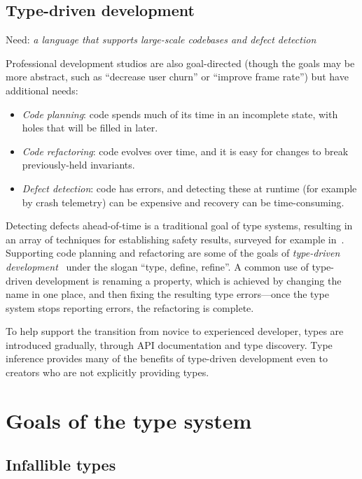 \documentclass[acmsmall]{acmart}
\begin{document}
\subsection{Type-driven development}

Need: \emph{a language that supports large-scale codebases and defect detection}

Professional development studios are also goal-directed (though the
goals may be more abstract, such as ``decrease user churn'' or
``improve frame rate'') but have additional needs:
\begin{itemize}

\item \emph{Code planning}:
  code spends much of its time in an incomplete state, with holes
  that will be filled in later.

\item \emph{Code refactoring}:
  code evolves over time, and it is easy for changes to
  break previously-held invariants.

\item \emph{Defect detection}:
  code has errors, and detecting these at runtime (for example by crash telemetry)
  can be expensive and recovery can be time-consuming.
  
\end{itemize}
Detecting defects ahead-of-time is a traditional goal of type systems,
resulting in an array of techniques for establishing safety results,
surveyed for example in~\cite{TAPL}. Supporting code planning and
refactoring are some of the goals of \emph{type-driven
development}~\cite{TDDIdris} under the slogan ``type, define,
refine''.  A common use of type-driven development is renaming a
property, which is achieved by changing the name in one place,
and then fixing the resulting type errors---once the type system stops
reporting errors, the refactoring is complete.

To help support the transition from novice to experienced developer,
types are introduced gradually, through API documentation and type discovery.
Type inference provides many of the benefits of type-driven development
even to creators who are not explicitly providing types.

\section{Goals of the type system}
\subsection{Infallible types}
\end{document}
